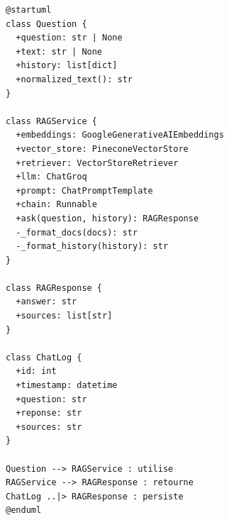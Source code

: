 \documentclass[12pt, a4paper, twoside]{report}
\begin{document}
\begin{lstlisting}[language={}, caption={Diagramme de classes PlantUML}, label={lst:plantuml-classes}]
@startuml
class Question {
  +question: str | None
  +text: str | None
  +history: list[dict]
  +normalized_text(): str
}

class RAGService {
  +embeddings: GoogleGenerativeAIEmbeddings
  +vector_store: PineconeVectorStore
  +retriever: VectorStoreRetriever
  +llm: ChatGroq
  +prompt: ChatPromptTemplate
  +chain: Runnable
  +ask(question, history): RAGResponse
  -_format_docs(docs): str
  -_format_history(history): str
}

class RAGResponse {
  +answer: str
  +sources: list[str]
}

class ChatLog {
  +id: int
  +timestamp: datetime
  +question: str
  +reponse: str
  +sources: str
}

Question --> RAGService : utilise
RAGService --> RAGResponse : retourne
ChatLog ..|> RAGResponse : persiste
@enduml
\end{lstlisting}
\end{document}
